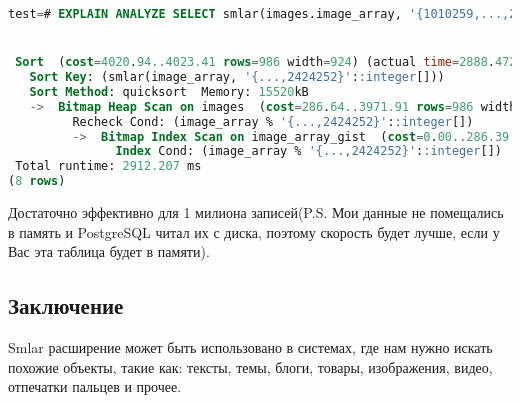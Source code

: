 \begin{lstlisting}[language=SQL,label=lst:smlar11,caption=Добавляем сортировку по сходству картинок]
test=# EXPLAIN ANALYZE SELECT smlar(images.image_array, '{1010259,...,2424252}'::int[]) as similarity FROM images WHERE images.image_array % '{1010259,1011253, ...,2423253,2424252}'::int[] ORDER BY similarity DESC;


 Sort  (cost=4020.94..4023.41 rows=986 width=924) (actual time=2888.472..2901.977 rows=200000 loops=1)
   Sort Key: (smlar(image_array, '{...,2424252}'::integer[]))
   Sort Method: quicksort  Memory: 15520kB
   ->  Bitmap Heap Scan on images  (cost=286.64..3971.91 rows=986 width=924) (actual time=474.436..2729.638 rows=200000 loops=1)
         Recheck Cond: (image_array % '{...,2424252}'::integer[])
         ->  Bitmap Index Scan on image_array_gist  (cost=0.00..286.39 rows=986 width=0) (actual time=421.140..421.140 rows=200000 loops=1)
               Index Cond: (image_array % '{...,2424252}'::integer[])
 Total runtime: 2912.207 ms
(8 rows)
\end{lstlisting}

Достаточно эффективно для 1 милиона записей(P.S. Мои данные не помещались в память и PostgreSQL читал их с диска, поэтому скорость будет лучше, если у Вас эта таблица будет в памяти).

\subsection{Заключение}

Smlar расширение может быть использовано в системах, где нам нужно искать похожие объекты, такие как: тексты, темы, блоги, товары, изображения, видео, отпечатки пальцев и прочее.